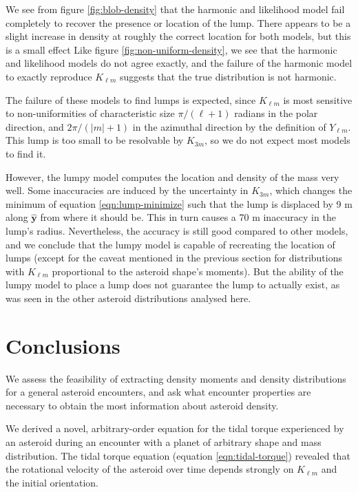 \documentclass[fleqn,usenatbib]{mnras}
\newcommand{\unit}[1]{\bm{\hat{#1}}}
\begin{document}
We see from figure \ref{fig:blob-density} that the harmonic and likelihood model fail completely to recover the presence or location of the lump. There appears to be a slight increase in density at roughly the correct location for both models, but this is a small effect Like figure \ref{fig:non-uniform-density}, we see that the harmonic and likelihood models do not agree exactly, and the failure of the harmonic model to exactly reproduce $K_{\ell m}$ suggests that the true distribution is not harmonic.

The failure of these models to find lumps is expected, since $K_{\ell m}$ is most sensitive to non-uniformities of characteristic size $\pi/(\ell + 1)$ radians in the polar direction, and $2\pi / (|m|+1)$ in the azimuthal direction by the definition of $Y_{\ell m}$. This lump is too small to be resolvable by $K_{3m}$, so we do not expect most models to find it.

However, the lumpy model computes the location and density of the mass very well. Some inaccuracies are induced by the uncertainty in $K_{3m}$, which changes the minimum of equation \ref{eqn:lump-minimize} such that the lump is displaced by 9 m along $\unit y$ from where it should be. This in turn causes a 70 m inaccuracy in the lump's radius. Nevertheless, the accuracy is still good compared to other models, and we conclude that the lumpy model is capable of recreating the location of lumps (except for the caveat mentioned in the previous section for distributions with $K_{\ell m}$ proportional to the asteroid shape's moments). But the ability of the lumpy model to place a lump does not guarantee the lump to actually exist, as was seen in the other asteroid distributions analysed here.

\section{Conclusions}

We assess the feasibility of extracting density moments and density distributions for a general asteroid encounters, and ask what encounter properties are necessary to obtain the most information about asteroid density.

We derived a novel, arbitrary-order equation for the tidal torque experienced by an asteroid during an encounter with a planet of arbitrary shape and mass distribution. The tidal torque equation (equation \ref{eqn:tidal-torque}) revealed that the rotational velocity of the asteroid over time depends strongly on $K_{\ell m}$ and the initial orientation.
\end{document}
